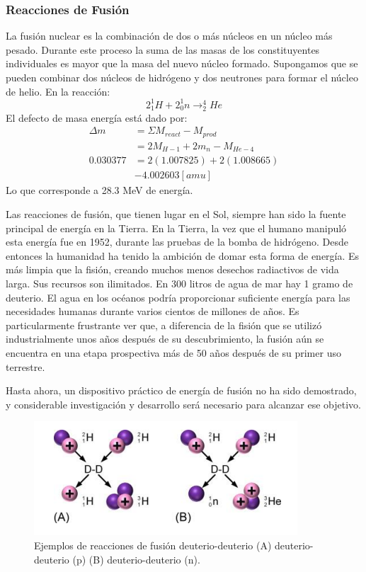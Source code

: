 \subsubsection{Reacciones de Fusión}
La fusión nuclear es la combinación de dos o más núcleos en un núcleo más pesado. Durante este proceso la suma de las masas de los constituyentes individuales es mayor que la masa del nuevo núcleo formado. Supongamos que se pueden combinar dos núcleos de hidrógeno y dos neutrones para
formar el núcleo de helio. En la reacción:
\begin{equation*}
    2^1_1H+2^1_0n \longrightarrow^4_2 He
\end{equation*}
El defecto de masa energía está dado por:
\begin{align}
    \nonumber \Delta m&=\Sigma M_{react}- M_{prod}\\
    \nonumber &=2M_{H-1}+2m_n-M_{He-4}\\
    \nonumber 0.030377&=2(1.007825)+2(1.008665)\\
    \nonumber &-4.002603\left[amu\right]
\end{align}
Lo que corresponde a 28.3 MeV de energía. \cite{Murray.2020}

Las reacciones de fusión, que tienen lugar en el Sol, siempre han sido la fuente principal de energía en la Tierra. En la Tierra, la vez que el humano manipuló esta energía fue en 1952, durante las pruebas de la bomba de hidrógeno. Desde entonces la humanidad ha tenido la ambición de domar esta forma de energía. Es más limpia que la fisión, creando muchos menos desechos radiactivos de vida larga. Sus recursos son ilimitados. En 300 litros de agua de mar hay 1 gramo de deuterio. El agua en los océanos podría proporcionar suficiente energía para las necesidades humanas durante varios cientos de millones de años. Es particularmente frustrante ver que, a diferencia de la fisión que se utilizó industrialmente unos años después de su descubrimiento, la fusión aún se encuentra en una etapa prospectiva más de 50 años después de su primer uso terrestre. \cite{Basdevant.2005}

Hasta ahora, un dispositivo práctico de energía de fusión no ha sido demostrado, y considerable investigación y desarrollo será necesario para alcanzar ese objetivo. \cite{Murray.2020}

\begin{figure}[H]
    \centering
    \includegraphics[scale=.65]{imagenes/fusion nuclear.png}
    \caption{Ejemplos de reacciones de fusión deuterio-deuterio (A) deuterio-deuterio (p) (B) deuterio-deuterio (n).\cite{Murray.2020}}
    \label{fig:fision}
\end{figure}
